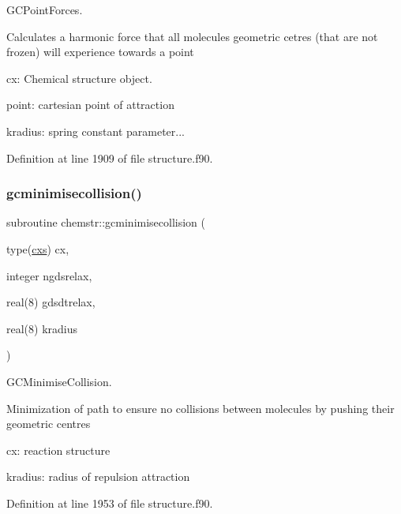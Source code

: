 G\+C\+Point\+Forces. 

Calculates a harmonic force that all molecules geometric cetres (that are not frozen) will experience towards a point


\begin{DoxyItemize}
\item cx\+: Chemical structure object.
\item point\+: cartesian point of attraction
\item kradius\+: spring constant parameter... 
\end{DoxyItemize}

Definition at line 1909 of file structure.\+f90.

\mbox{\label{namespacechemstr_a32a650687453b543778404b5fb1e6e24}} 
\subsubsection{\texorpdfstring{gcminimisecollision()}{gcminimisecollision()}}
{\footnotesize\ttfamily subroutine chemstr\+::gcminimisecollision (\begin{DoxyParamCaption}\item[{type(\mbox{\hyperlink{structchemstr_1_1cxs}{cxs}})}]{cx,  }\item[{integer}]{ngdsrelax,  }\item[{real(8)}]{gdsdtrelax,  }\item[{real(8)}]{kradius }\end{DoxyParamCaption})}



G\+C\+Minimise\+Collision. 

Minimization of path to ensure no collisions between molecules by pushing their geometric centres


\begin{DoxyItemize}
\item cx\+: reaction structure
\item kradius\+: radius of repulsion attraction 
\end{DoxyItemize}

Definition at line 1953 of file structure.\+f90.

\mbox{\label{namespacechemstr_a4bdb519846a266ecf21fb1abb2dd12fb}} 
